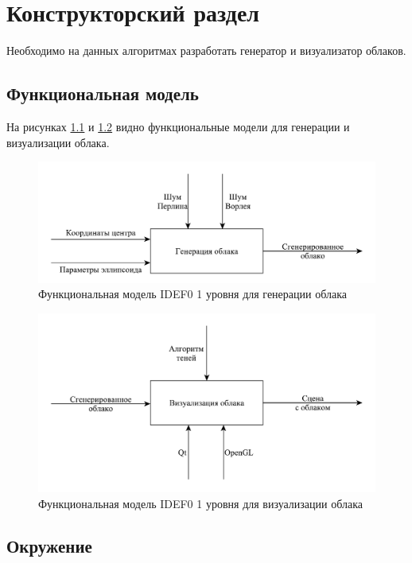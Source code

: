 \chapter{Конструкторский раздел}
\label{cha:design}

Необходимо на данных алгоритмах разработать генератор и визуализатор облаков.

\section{Функциональная модель}

На рисунках \ref{img:idef0} и \ref{img:idef0_1} видно функциональные модели для генерации и визуализации облака.

\begin{figure}[H]
    \centering
    \includegraphics[scale=0.6]{img/idef0.pdf}
    \caption{Функциональная модель IDEF0 1 уровня для генерации облака}
    \label{img:idef0}
\end{figure}

\begin{figure}[H]
    \centering
    \includegraphics[scale=0.6]{img/idef0_1.pdf}
    \caption{Функциональная модель IDEF0 1 уровня для визуализации облака}
    \label{img:idef0_1}
\end{figure}

\section{Окружение}

